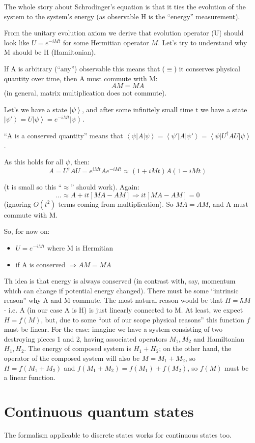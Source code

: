 \documentclass{scrartcl}
\newcommand{\ket}[1]{\left| #1 \right>} %
\newcommand{\bra}[1]{\left< #1 \right|} %
\begin{document}
The whole story about Schrodinger's equation is that it ties the evolution of
the system to the system's energy (as observable H is the ``energy''
measurement).

From the unitary evolution axiom we derive that evolution operator (U) should
look like $U=e^{-iMt}$ for some Hermitian operator $M$. Let's try to understand
why M should be H (Hamiltonian).

If A is arbitrary (``any'') observable this means that ($\equiv$) it conserves
physical quantity over time, then A must commute with M:
$$ A M = M A$$ (in general, matrix multiplication does not commute).

Let's we have a state $\ket\psi$, and after some infinitely small time t we have
a state $\ket{\psi'} = U \ket \psi = e^{-iMt}\ket\psi $.

``A is a conserved quantity'' means that $\bra\psi A \ket\psi = \bra{\psi'} A
\ket{\psi'} = \bra\psi U^\dag A U \ket\psi$.

As this holds for all $\psi$, then:
$$A = U^\dag A U = e^{iMt} A e^{-iMt}\approx (1+iMt) A (1-iMt)$$

(t is small so this ``$\approx$'' should work). Again:
$$ \dots \approx A + it[MA-AM] \Rightarrow it [MA-AM] = 0$$
(ignoring $O(t^2)$ terms coming from multiplication). So $MA = AM$, and A must
commute with M.

So, for now on: \begin{itemize}
\item $U = e^{-iMt}$ where M is Hermitian
\item if A is conserved $\Rightarrow AM = MA$
\end{itemize}
Th idea is that energy is always conserved (in contrast with, say, momentum
which can change if potential energy changed). There must be some ``intrinsic
reason'' why A and M commute.
The most natural reason would be that $H = \hbar M$ - i.e. A (in our case A is
H) is just linearly connected to M. At least, we expect $H = f(M)$, but, due to
some ``out of our scope physical reasons'' this function $f$ must be linear. For
the case: imagine we have a system consisting of two destroying pieces 1 and 2,
having associated operators $M_1, M_2$ and Hamiltonian $H_1, H_2$. The energy of
composed system is $H_1 + H_2$; on the other hand, the operator of the composed
system will also be $M = M_1 + M_2$, so $H = f(M_1 + M_2)$ and $f(M_1 + M_2) =
f(M_1) + f(M_2)$, so $f(M)$ must be a linear function.

\section{Continuous quantum states}
\label{sec:ContinuousQuantumStates}
The formalism applicable to discrete states works for continuous states too.
\end{document}

